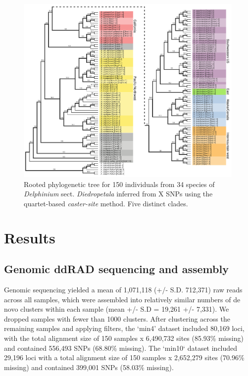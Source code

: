 \documentclass[11pt]{article}
\begin{document}
\begin{figure}[t!]
	\centering
	  \includegraphics[width=0.99\textwidth]{./figures/caster-trees.pdf}	
	\caption{
        Rooted phylogenetic tree for 150 individuals from 34 species of
        \emph{Delphinium} sect. \emph{Diedropetala} inferred from 
        X SNPs using the quartet-based \emph{caster-site} method.
        Five distinct clades.
	}
	\label{fig:bigtree}
\end{figure}


\section{Results}
\subsection{Genomic ddRAD sequencing and assembly}
Genomic sequencing yielded a mean of 1,071,118 (+/- S.D. 712,371) raw reads 
across all samples, which were assembled into relatively similar numbers of 
de novo clusters within each sample (mean +/- S.D = 19,261 +/- 7,331). 
% 
We dropped samples with fewer than 1000 clusters. 
After clustering across the remaining samples and applying filters, 
the `min4’ dataset included 80,169 loci, with the total alignment size of
150 samples x 6,490,732 sites (85.93\% missing) and contained 556,493 
SNPs (68.80\% missing). 
The `min10` dataset included 29,196 loci with a total alignment size of 
150 samples x 2,652,279 sites (70.96\% missing) and contained 399,001 SNPs
(58.03\% missing).
\end{document}
